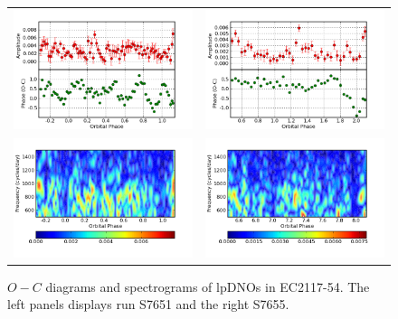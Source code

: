 \begin{figure}[t]
\begin{narrow}{-1in}{0in}
\begin{tabular}{cc}
 \includegraphics[width = 0.65\columnwidth, bb=0 0 600 400]{images/august_phot/S7651/S7651_89.95.png} & 
 \includegraphics[width = 0.65\columnwidth, bb=0 0 600 400]{images/august_phot/S7655/S7655_104.2.png}  \\
 \includegraphics[width = 0.65\columnwidth, bb=0 0 600 400]{images/august_phot/S7651/S7651_trailed_FT_lpDNO.png} &
 \includegraphics[width = 0.65\columnwidth, bb=0 0 600 400]{images/august_phot/S7655/S7655_lpDNO_trailed_FT.png}
\end{tabular}
\end{narrow}
\caption[$O-C$ diagrams and spectrograms of lpDNOs in EC2117-54]{$O-C$ diagrams and spectrograms of lpDNOs in EC2117-54. The left panels displays run S7651 and the right S7655.} 
\label{aug_lpDNOs}
\end{figure}

